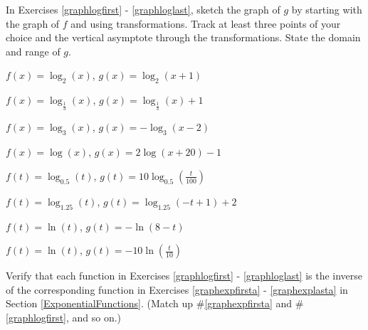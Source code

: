 \documentclass{ximera}
\begin{document}
\begin{problem}
In Exercises \ref{graphlogfirst} - \ref{graphloglast}, sketch the graph of $g$ by starting with the graph of $f$ and using transformations.  Track at least three points of your choice and the vertical asymptote through the transformations. State the domain and range of $g$.

\begin{question}\label{graphlogfirst}
$f(x) = \log_{2}(x)$, $g(x) = \log_{2}(x+1)$ 
\end{question}

\begin{question}
$f(x) = \log_{\frac{1}{3}}(x)$, $g(x) = \log_{\frac{1}{3}}(x)+1$
\end{question}

\begin{question}
$f(x) = \log_{3}(x)$, $g(x) = -\log_{3}(x-2)$
\end{question}

\begin{question}
$f(x) = \log(x)$, $g(x) = 2\log(x+20) -1$ 
\end{question}

\begin{question}
$f(t) = \log_{0.5}(t)$, $g(t) = 10 \log_{0.5}\left(\frac{t}{100}\right)$
\end{question}

\begin{question}
$f(t) = \log_{1.25}(t)$, $g(t) = \log_{1.25}(-t+1) + 2$
\end{question}

\begin{question}
$f(t) = \ln(t)$, $g(t) = -\ln(8-t)$
\end{question}

\begin{question}\label{graphloglast}
$f(t) = \ln(t)$, $g(t) = -10\ln\left(\frac{t}{10}\right)$ 
\end{question}

\end{problem}

\begin{question}
Verify that each function in Exercises \ref{graphlogfirst} - \ref{graphloglast} is the inverse of the corresponding function in Exercises \ref{graphexpfirsta} - \ref{graphexplasta} in Section \ref{ExponentialFunctions}.  (Match up \#\ref{graphexpfirsta} and \#\ref{graphlogfirst}, and so on.)    
\end{question}
  
\end{document}
